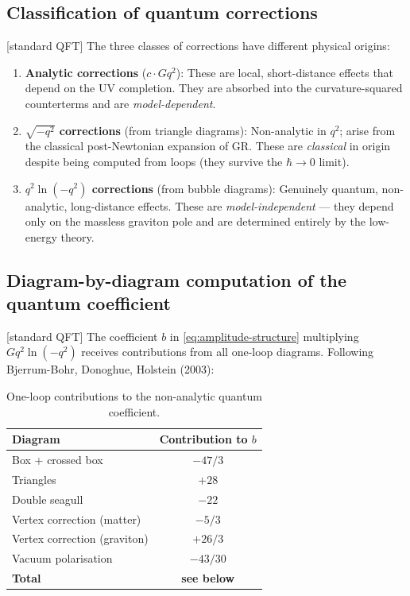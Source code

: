 \documentclass[12pt,a4paper]{article}
\theoremstyle{definition}
\theoremstyle{remark}
\newcommand{\stdqft}{\textcolor{teal!80!black}{\textsf{[standard QFT]}}}
\begin{document}
\subsection{Classification of quantum corrections}

\stdqft\;
The three classes of corrections have different physical origins:

\begin{enumerate}[label=(\roman*)]
\item \textbf{Analytic corrections} ($c\cdot Gq^2$):
  These are local, short-distance effects that depend on the UV
  completion.  They are absorbed into the curvature-squared counterterms
  and are \emph{model-dependent}.

\item \textbf{$\sqrt{-q^2}$ corrections} (from triangle diagrams):
  Non-analytic in $q^2$; arise from the classical post-Newtonian
  expansion of GR.  These are \emph{classical} in origin despite being
  computed from loops (they survive the $\hbar\to 0$ limit).

\item \textbf{$q^2\ln(-q^2)$ corrections} (from bubble diagrams):
  Genuinely quantum, non-analytic, long-distance effects.  These are
  \emph{model-independent} --- they depend only on the massless
  graviton pole and are determined entirely by the low-energy theory.
\end{enumerate}


\subsection{Diagram-by-diagram computation of the quantum coefficient}

\stdqft\;
The coefficient $b$ in \eqref{eq:amplitude-structure} multiplying
$Gq^2\ln(-q^2)$ receives contributions from all one-loop diagrams.
Following Bjerrum-Bohr, Donoghue, Holstein (2003):

\begin{table}[h]
\centering
\begin{tabular}{@{}lc@{}}
\toprule
\textbf{Diagram} & \textbf{Contribution to $b$} \\
\midrule
Box + crossed box         & $-47/3$  \\
Triangles                 & $+28$    \\
Double seagull            & $-22$    \\
Vertex correction (matter)   & $-5/3$   \\
Vertex correction (graviton) & $+26/3$  \\
Vacuum polarisation       & $-43/30$ \\
\midrule
\textbf{Total}            & \textbf{see below} \\
\bottomrule
\end{tabular}
\caption{One-loop contributions to the non-analytic quantum coefficient.}
\label{tab:diagrams}
\end{table}
\end{document}
